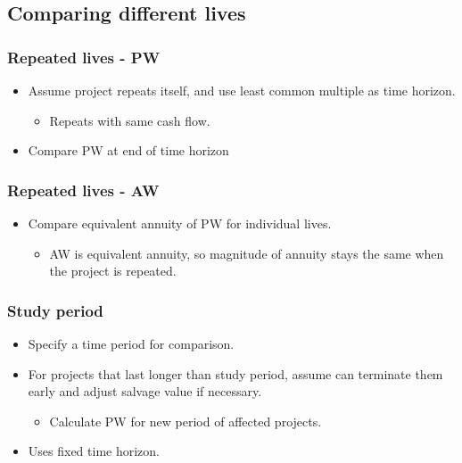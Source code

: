 \subsection{Comparing different lives}
\begin{example}
    \subsubsection{Repeated lives - PW}
        \begin{itemize}
            \item Assume project repeats itself, and use least common multiple as time horizon. 
            \begin{itemize}
                \item Repeats with same cash flow.
            \end{itemize}
            \item Compare PW at end of time horizon
        \end{itemize}

    \subsubsection{Repeated lives - AW}
        \begin{itemize}
            \item Compare equivalent annuity of PW for individual lives.
            \begin{itemize}
                \item AW is equivalent annuity, so magnitude of annuity stays the same when the project is repeated.
            \end{itemize}
        \end{itemize}
        
    \subsubsection{Study period}
        \begin{itemize}
            \item Specify a time period for comparison. 
            \item For projects that last longer than study period, assume can terminate them early and adjust salvage value if necessary.
            \begin{itemize}
                \item Calculate PW for new period of affected projects. 
            \end{itemize}
            \item Uses fixed time horizon. 
        \end{itemize}
\end{example}